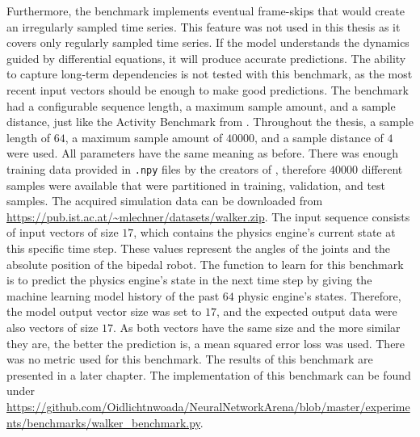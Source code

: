 \documentclass[draft,final]{vutinfth} %
\begin{document}
    Furthermore, the benchmark implements eventual frame-skips that would create an irregularly sampled time series.
    This feature was not used in this thesis as it covers only regularly sampled time series.
    If the model understands the dynamics guided by differential equations, it will produce accurate predictions.
    The ability to capture long-term dependencies is not tested with this benchmark, as the most recent input vectors should be enough to make good predictions.
    The benchmark had a configurable sequence length, a maximum sample amount, and a sample distance, just like the Activity Benchmark from .
    Throughout the thesis, a sample length of $64$, a maximum sample amount of $40000$, and a sample distance of $4$ were used.
    All parameters have the same meaning as before.
    There was enough training data provided in \texttt{.npy} files by the creators of \cite{ODELSTM}, therefore $40000$ different samples were available that were partitioned in training, validation, and test samples.
    The acquired simulation data can be downloaded from \url{https://pub.ist.ac.at/~mlechner/datasets/walker.zip}.
    The input sequence consists of input vectors of size $17$, which contains the physics engine's current state at this specific time step.
    These values represent the angles of the joints and the absolute position of the bipedal robot.
    The function to learn for this benchmark is to predict the physics engine's state in the next time step by giving the machine learning model history of the past $64$ physic engine's states.
    Therefore, the model output vector size was set to $17$, and the expected output data were also vectors of size $17$.
    As both vectors have the same size and the more similar they are, the better the prediction is, a mean squared error loss was used.
    There was no metric used for this benchmark.
    The results of this benchmark are presented in a later chapter.
    The implementation of this benchmark can be found under \url{https://github.com/Oidlichtnwoada/NeuralNetworkArena/blob/master/experiments/benchmarks/walker_benchmark.py}.
\end{document}
